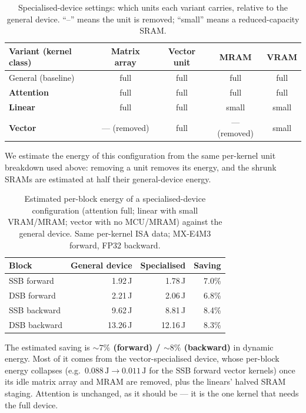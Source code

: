 \documentclass[11pt]{report}
\begin{document}
\begin{table}[h]
\centering
\caption{Specialised-device settings: which units each variant carries,
relative to the general device. ``--'' means the unit is removed; ``small''
means a reduced-capacity SRAM.}
\label{tab:specialised-settings}
\begin{tabular}{@{}lcccc@{}}
\toprule
Variant (kernel class) & Matrix array & Vector unit & MRAM & VRAM \\
\midrule
General (baseline) & full & full & full & full \\
\textbf{Attention} & full & full & full & full \\
\textbf{Linear} & full & full & small & small \\
\textbf{Vector} & --- (removed) & full & --- (removed) & small \\
\bottomrule
\end{tabular}
\end{table}

We estimate the energy of this configuration from the same per-kernel unit
breakdown used above: removing a unit removes its energy, and the shrunk
SRAMs are estimated at half their general-device energy.

\begin{table}[h]
\centering
\caption{Estimated per-block energy of a specialised-device configuration
(attention full; linear with small VRAM/MRAM; vector with no MCU/MRAM)
against the general device. Same per-kernel ISA data; MX-E4M3 forward, FP32
backward.}
\label{tab:specialised-energy}
\begin{tabular}{@{}lrrr@{}}
\toprule
Block & General device & Specialised & Saving \\
\midrule
SSB forward & 1.92\,J & 1.78\,J & 7.0\% \\
DSB forward & 2.21\,J & 2.06\,J & 6.8\% \\
SSB backward & 9.62\,J & 8.81\,J & 8.4\% \\
DSB backward & 13.26\,J & 12.16\,J & 8.3\% \\
\bottomrule
\end{tabular}
\end{table}

The estimated saving is \textbf{${\sim}7\%$ (forward) / ${\sim}8\%$
(backward)} in dynamic energy. Most of it comes from the vector-specialised
device, whose per-block energy collapses (e.g.\ $0.088\,\text{J}\to
0.011\,\text{J}$ for the SSB forward vector kernels) once its idle matrix
array and MRAM are removed, plus the linears' halved SRAM staging. Attention
is unchanged, as it should be --- it is the one kernel that needs the full
device.
\end{document}
